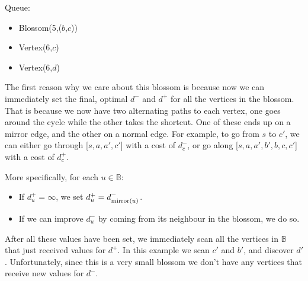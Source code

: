 \begin{minipage}{.7\linewidth}
\end{minipage}\hfill%
\begin{minipage}{.26\linewidth}
    \vspace{2cm}
    Queue:
    \begin{itemize}
        \item Blossom(5,($b$,$c$))
        \item Vertex(6,$c$)
        \item Vertex(6,$d$)
    \end{itemize}
\end{minipage}

The first reason why we care about this blossom is because now we can immediately set the final, optimal $d^-$ and $d^+$ for all the vertices in the blossom. That is because we now have two alternating paths to each vertex, one goes around the cycle while the other takes the shortcut. One of these ends up on a mirror edge, and the other on a normal edge. For example, to go from $s$ to $c'$, we can either go through [$s,a,a',c'$] with a cost of $d^-_c$, or go along [$s,a,a',b',b,c,c'$] with a cost of $d^+_c$.

More specifically, for each $u \in \mathbb{B}$: \begin{itemize}
    \item If $d^+_u = \infty$, we set $d^+_u = d^-_{\operatorname{mirror}(u)}$.
    \item If we can improve $d^-_u$ by coming from its neighbour in the blossom, we do so.
\end{itemize}
After all these values have been set, we immediately scan all the vertices in $\mathbb{B}$ that just received values for $d^+$. In this example we scan $c'$ and $b'$, and discover $d'$. Unfortunately, since this is a very small blossom we don't have any vertices that receive new values for $d^-$.

